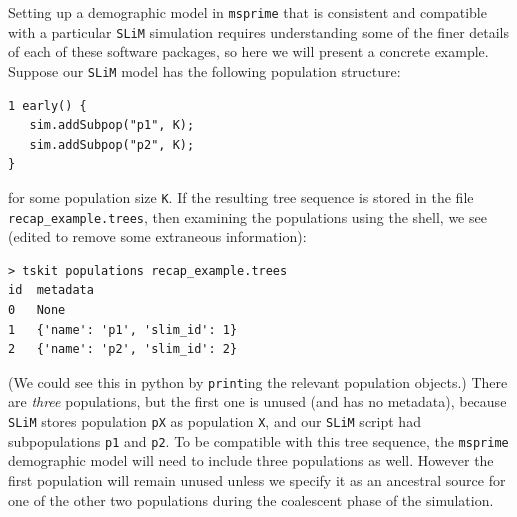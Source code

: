 \documentclass[12pt]{article}
\newcommand{\msprime}[0]{\texttt{msprime}\xspace}
\newcommand{\slim}[0]{\texttt{SLiM}\xspace}
\begin{document}
Setting up a demographic model in \msprime that is consistent and compatible with a particular \slim simulation requires
understanding some of the finer details of each of these software packages, so here we will present a concrete example.
Suppose our \slim model has the following population structure:
\begin{lstlisting}[language=slim, style=slimstyle, breaklines=true]
1 early() {
   sim.addSubpop("p1", K);
   sim.addSubpop("p2", K);
}
\end{lstlisting}
for some population size \verb|K|.
If the resulting tree sequence is stored in the file \texttt{recap\_example.trees},
then examining the populations using the shell, we see
(edited to remove some extraneous information):
\begin{verbatim}
> tskit populations recap_example.trees
id	metadata
0	None
1	{'name': 'p1', 'slim_id': 1}
2	{'name': 'p2', 'slim_id': 2}
\end{verbatim}
(We could see this in python by \verb|print|ing the relevant population objects.)
There are \emph{three} populations, but the first one is unused (and has no metadata),
because \slim stores population \texttt{pX} as population \texttt{X},
and our \slim script had subpopulations \verb|p1| and \verb|p2|.
To be compatible with this tree sequence, the \msprime demographic model will need to include three populations as well.
However the first population will remain unused unless we specify it as an ancestral source for
one of the other two populations during the coalescent phase of the simulation.
\end{document}

